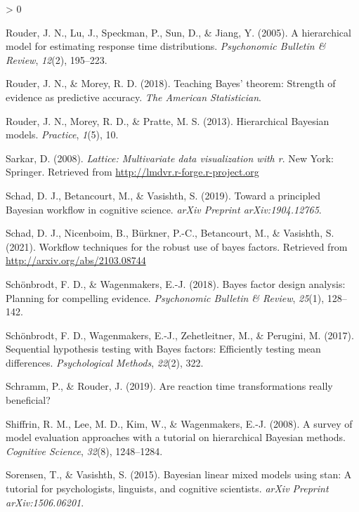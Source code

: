 \documentclass[
  english,
  doc,floatsintext]{apa6}
\newlength{\cslhangindent}
\newenvironment{CSLReferences}[2] %
 {%
  \setlength{\parindent}{0pt}
  \ifodd #1 \everypar{\setlength{\hangindent}{\cslhangindent}}\ignorespaces\fi
  \ifnum #2 > 0
  \setlength{\parskip}{#2\baselineskip}
  \fi
 }%
 {}
\begin{document}
\begin{CSLReferences}{1}{0}
\leavevmode\hypertarget{ref-rouder2005hierarchical}{}%
Rouder, J. N., Lu, J., Speckman, P., Sun, D., \& Jiang, Y. (2005). A hierarchical model for estimating response time distributions. \emph{Psychonomic Bulletin \& Review}, \emph{12}(2), 195--223.

\leavevmode\hypertarget{ref-rouder2018teaching}{}%
Rouder, J. N., \& Morey, R. D. (2018). Teaching {Bayes}' theorem: Strength of evidence as predictive accuracy. \emph{The American Statistician}.

\leavevmode\hypertarget{ref-rouder2013hierarchical}{}%
Rouder, J. N., Morey, R. D., \& Pratte, M. S. (2013). Hierarchical {Bayesian} models. \emph{Practice}, \emph{1}(5), 10.

\leavevmode\hypertarget{ref-R-lattice}{}%
Sarkar, D. (2008). \emph{Lattice: Multivariate data visualization with r}. New York: Springer. Retrieved from \url{http://lmdvr.r-forge.r-project.org}

\leavevmode\hypertarget{ref-schad2019toward}{}%
Schad, D. J., Betancourt, M., \& Vasishth, S. (2019). Toward a principled {Bayesian} workflow in cognitive science. \emph{arXiv Preprint arXiv:1904.12765}.

\leavevmode\hypertarget{ref-schad2021workflow}{}%
Schad, D. J., Nicenboim, B., Bürkner, P.-C., Betancourt, M., \& Vasishth, S. (2021). Workflow techniques for the robust use of bayes factors. Retrieved from \url{http://arxiv.org/abs/2103.08744}

\leavevmode\hypertarget{ref-schonbrodt2018bayes}{}%
Schönbrodt, F. D., \& Wagenmakers, E.-J. (2018). Bayes factor design analysis: Planning for compelling evidence. \emph{Psychonomic Bulletin \& Review}, \emph{25}(1), 128--142.

\leavevmode\hypertarget{ref-schonbrodt2017sequential}{}%
Schönbrodt, F. D., Wagenmakers, E.-J., Zehetleitner, M., \& Perugini, M. (2017). Sequential hypothesis testing with {Bayes} factors: Efficiently testing mean differences. \emph{Psychological Methods}, \emph{22}(2), 322.

\leavevmode\hypertarget{ref-schramm2019reaction}{}%
Schramm, P., \& Rouder, J. (2019). Are reaction time transformations really beneficial?

\leavevmode\hypertarget{ref-shiffrin2008survey}{}%
Shiffrin, R. M., Lee, M. D., Kim, W., \& Wagenmakers, E.-J. (2008). A survey of model evaluation approaches with a tutorial on hierarchical {Bayesian} methods. \emph{Cognitive Science}, \emph{32}(8), 1248--1284.

\leavevmode\hypertarget{ref-sorensen2015bayesian}{}%
Sorensen, T., \& Vasishth, S. (2015). Bayesian linear mixed models using stan: A tutorial for psychologists, linguists, and cognitive scientists. \emph{arXiv Preprint arXiv:1506.06201}.


\end{CSLReferences}
\end{document}
